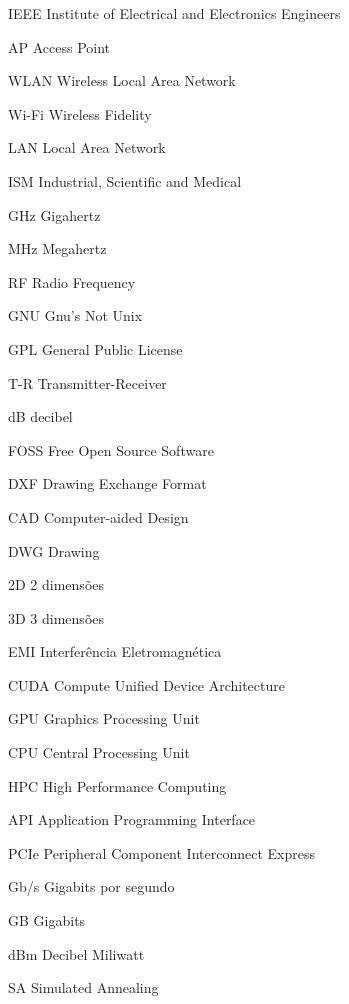 \documentclass[
	12pt,				%
	openright,			%
	twoside,			%
	a4paper,			%
	english,			%
	french,				%
	spanish,			%
	brazil				%
	]{abntex2}
\begin{document}
\listoffigures*
\cleardoublepage

\listoftables*
\cleardoublepage

\begin{siglas}
  \item[IEEE] Institute of Electrical and Electronics Engineers
  \item[AP] Access Point
  \item[WLAN] Wireless Local Area Network
  \item[Wi-Fi] Wireless Fidelity
  \item[LAN] Local Area Network
  \item[ISM] Industrial, Scientific and Medical
  \item[GHz] Gigahertz
  \item[MHz] Megahertz
  \item[RF] Radio Frequency
  \item[GNU] Gnu's Not Unix
  \item[GPL] General Public License
  \item[T-R] Transmitter-Receiver
  \item[dB] decibel
  \item[FOSS] Free Open Source Software
  \item[DXF] Drawing Exchange Format
  \item[CAD] Computer-aided Design
  \item[DWG] Drawing
  \item[2D] 2 dimensões
  \item[3D] 3 dimensões
  \item[EMI] Interferência Eletromagnética
  \item[CUDA] Compute Unified Device Architecture
  \item[GPU] Graphics Processing Unit
  \item[CPU] Central Processing Unit
  \item[HPC] High Performance Computing
  \item[API] Application Programming Interface
  \item[PCIe] Peripheral Component Interconnect Express
  \item[Gb/s] Gigabits por segundo
  \item[GB] Gigabits
  \item[dBm] Decibel Miliwatt
  \item[SA] Simulated Annealing
\end{siglas}
\end{document}
